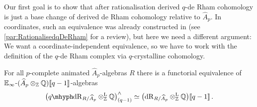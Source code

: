 \documentclass[DIV=12,numbers=enddot,leqno,bibliography=totoc]{scrartcl}
\begin{document}
	Our first goal is to show that after rationalisation derived $q$-de Rham cohomology is just a base change of derived de Rham cohomology relative to $\widehat{A}_p$. In coordinates, such an equivalence was already constructed in \cite[Lemma~]{Toulouse} (see \cref{par:RationalisedqDeRham} for a review), but here we need a different argument: We want a coordinate-independent equivalence, so we have to work with the definition of the $q$-de Rham complex via $q$-crystalline cohomology.
	\begin{lem}\label{lem:RationalisedqCrystalline}
		For all $p$-complete animated $\widehat{A}_p$-algebras $R$ there is a functorial equivalence of $\mathbb{E}_\infty$-$(\widehat{A}_p\otimes_{\mathbb{Z}}\mathbb{Q})\llbracket q-1\rrbracket$-algebras
		\begin{equation*}
			\bigl(\qdeRham_{R/\smash{\widehat{A}}_p}\lotimes_{\IZ}\IQ\bigr)_{(q-1)}^\complete\simeq \bigl(\deRham_{R/\smash{\widehat{A}}_p}\lotimes_{\IZ}\IQ\bigr)\qpower\,.
		\end{equation*}
	\end{lem}
\end{document}
